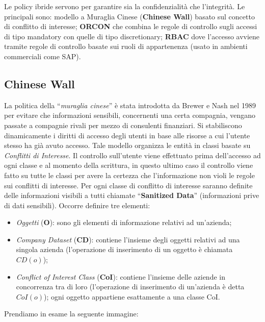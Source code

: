 Le policy ibride servono per garantire sia la confidenzialità che l'integrità.
Le principali sono: modello a Muraglia Cinese (\textbf{Chinese Wall}) basato sul
concetto di conflitto di interesse; \textbf{ORCON} che combina le regole di
controllo sugli accessi di tipo mandatory con quelle di tipo discretionary;
\textbf{RBAC} dove l'accesso avviene tramite regole di controllo basate sui
ruoli di appartenenza (usato in ambienti commerciali come SAP).

\subsection{Chinese Wall}

La politica della “\textit{muraglia cinese}” è stata introdotta da Brewer e Nash
nel 1989 per evitare che informazioni sensibili, concernenti una certa compagnia,
vengano passate a compagnie rivali per mezzo di consulenti finanziari.
Si stabiliscono dinamicamente i diritti di accesso degli utenti in base
alle risorse a cui l'utente stesso ha già avuto accesso.
Tale modello organizza le entità in classi basate su \textit{Conflitti di Interesse}.
Il controllo sull'utente
viene effettuato prima dell'accesso ad ogni classe e al momento della scrittura,
in questo ultimo
caso il controllo viene fatto su tutte le classi per avere la certezza che
l'informazione non violi le
regole sui conflitti di interesse. Per ogni classe di conflitto di interesse
saranno definite delle
informazioni visibili a tutti chiamate “\textbf{Sanitized Data}”
(informazioni prive di dati sensibili).
Occorre definire tre elementi:

\begin{itemize}
      \item \textit{Oggetti} (\textbf{O}): sono gli elementi di informazione
            relativi ad un'azienda;
      \item \textit{Company Dataset} (\textbf{CD}): contiene l'insieme degli
            oggetti relativi ad una singola azienda
            (l'operazione di inserimento di un oggetto è chiamata \(CD(o)\));
      \item \textit{Conflict of Interest Class} (\textbf{CoI}): contiene
            l'insieme delle aziende in concorrenza tra di
            loro (l'operazione di inserimento di un'azienda è detta \(CoI(o)\));
            ogni oggetto appartiene
            esattamente a una classe CoI.
\end{itemize}

Prendiamo in esame la seguente immagine:

